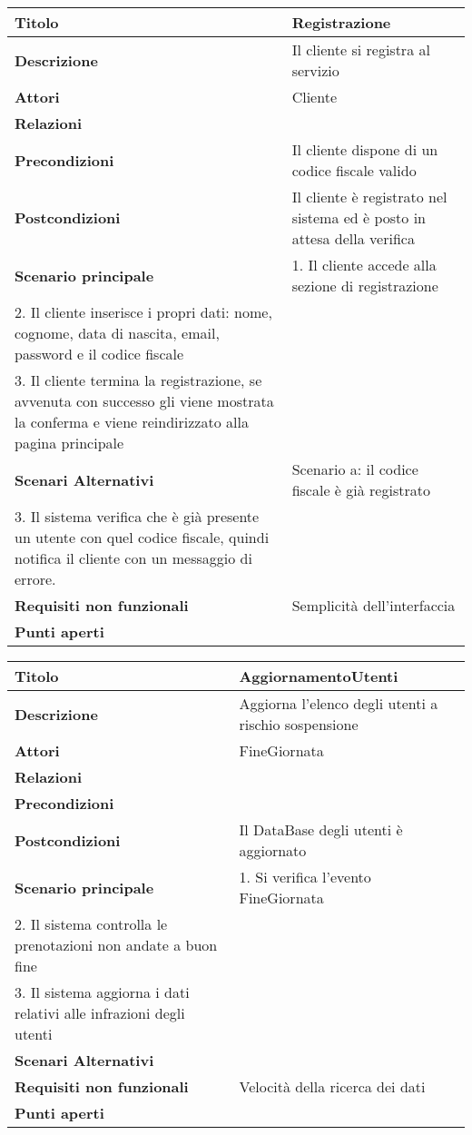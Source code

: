 \begin{tabular} {|P{4.5cm}|P{12.5cm}|}
  \hline
    \textbf{Titolo} & Registrazione\\
  \hline
    \textbf{Descrizione} & Il cliente si registra al servizio\\
  \hline
    \textbf{Attori} & Cliente\\
  \hline
    \textbf{Relazioni} &\\
  \hline
  \textbf{Precondizioni} & Il cliente dispone di un codice fiscale valido\\
  \hline
    \textbf{Postcondizioni} & Il cliente è registrato nel sistema ed è posto in attesa della verifica\\
  \hline
    \textbf{Scenario principale} & 1. Il cliente accede alla sezione di registrazione \\ 2. Il cliente inserisce i propri dati: nome, cognome, data di nascita, email, password e il codice fiscale \\ 3. Il cliente termina la registrazione, se avvenuta con successo gli viene mostrata la conferma e viene reindirizzato alla pagina principale\\
  \hline
    \textbf{Scenari Alternativi} & Scenario a: il codice fiscale è già registrato \\ 3. Il sistema verifica che è già presente un utente con quel codice fiscale, quindi notifica il cliente con un messaggio di errore.\\
  \hline
    \textbf{Requisiti non funzionali} & Semplicità dell'interfaccia\\
  \hline
    \textbf{Punti aperti} &\\
  \hline
\end{tabular}
\hfill
\break

\begin{tabular} {|P{4.5cm}|P{12.5cm}|}
\hline
  \textbf{Titolo} & AggiornamentoUtenti\\
\hline
  \textbf{Descrizione} & Aggiorna l'elenco degli utenti a rischio sospensione\\
\hline
  \textbf{Attori} & FineGiornata\\
\hline
  \textbf{Relazioni} &\\
\hline
  \textbf{Precondizioni} &\\
\hline
  \textbf{Postcondizioni} & Il DataBase degli utenti è aggiornato\\
\hline
  \textbf{Scenario principale} & 1. Si verifica l'evento FineGiornata\\ 2. Il sistema controlla le prenotazioni non andate a buon fine \\ 3. Il sistema aggiorna i dati relativi alle infrazioni degli utenti\\
\hline
  \textbf{Scenari Alternativi} &\\
\hline
  \textbf{Requisiti non funzionali} & Velocità della ricerca dei dati\\
\hline
  \textbf{Punti aperti} &\\
\hline
\end{tabular}
\hfill
\break

